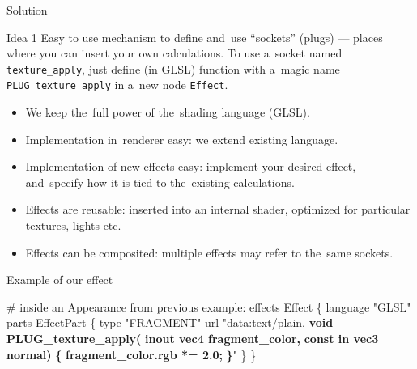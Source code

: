\documentclass{beamer}
\begin{document}
\begin{frame}{Solution}

\begin{block}{Idea 1}
Easy to use mechanism to define and~use
``sockets'' (plugs) --- places where you can insert your own calculations.
To use a~socket named \texttt{texture\_apply},
just define (in GLSL) function with a~magic name \texttt{PLUG\_texture\_apply}
in a~new node \texttt{Effect}.
\end{block}

\begin{itemize}
  \item We keep the~full power of the~shading language (GLSL).
  \item Implementation in~renderer easy: we extend existing language.
  \item Implementation of new effects easy: implement
    your desired effect, and~specify how it is tied to the~existing
    calculations.
  \item Effects are reusable: inserted into an internal shader,
    optimized for particular textures, lights etc.
  \item Effects can be composited: multiple effects may refer to the~same sockets.
\end{itemize}
\end{frame}

\begin{frame}[fragile]
\begin{exampleblock}{Example of our effect}
\begin{semiverbatim}
\# inside an Appearance from previous example:
effects Effect \{
  language "GLSL"
  parts EffectPart \{
    type "FRAGMENT"
    url "data:text/plain,
\textbf{    void PLUG\_texture\_apply(}
\textbf{      inout vec4 fragment\_color,}
\textbf{      const in vec3 normal)}
\textbf{    \{}
\textbf{      fragment\_color.rgb *= 2.0;}
\textbf{    \}}"
  \}
\}
\end{semiverbatim}
\end{exampleblock}
\end{frame}

\end{document}
